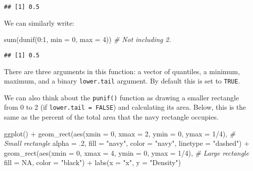 \documentclass[
]{article}
\newenvironment{Shaded}{\begin{snugshade}}{\end{snugshade}}
\newcommand{\AttributeTok}[1]{\textcolor[rgb]{0.77,0.63,0.00}{#1}}
\newcommand{\CommentTok}[1]{\textcolor[rgb]{0.56,0.35,0.01}{\textit{#1}}}
\newcommand{\ConstantTok}[1]{\textcolor[rgb]{0.00,0.00,0.00}{#1}}
\newcommand{\DecValTok}[1]{\textcolor[rgb]{0.00,0.00,0.81}{#1}}
\newcommand{\FunctionTok}[1]{\textcolor[rgb]{0.00,0.00,0.00}{#1}}
\newcommand{\NormalTok}[1]{#1}
\newcommand{\SpecialCharTok}[1]{\textcolor[rgb]{0.00,0.00,0.00}{#1}}
\newcommand{\StringTok}[1]{\textcolor[rgb]{0.31,0.60,0.02}{#1}}
\begin{document}
\begin{verbatim}
## [1] 0.5
\end{verbatim}

We can similarly write:

\begin{Shaded}
\begin{Highlighting}[]
\FunctionTok{sum}\NormalTok{(}\FunctionTok{dunif}\NormalTok{(}\DecValTok{0}\SpecialCharTok{:}\DecValTok{1}\NormalTok{, }\AttributeTok{min =} \DecValTok{0}\NormalTok{, }\AttributeTok{max =} \DecValTok{4}\NormalTok{)) }\CommentTok{\# Not including 2.}
\end{Highlighting}
\end{Shaded}

\begin{verbatim}
## [1] 0.5
\end{verbatim}

There are three arguments in this function: a vector of quantiles, a minimum, maximum, and a binary \texttt{lower.tail} argument. By default this is set to \texttt{TRUE}.

We can also think about the \texttt{punif()} function as drawing a smaller rectangle from 0 to 2 (if \texttt{lower.tail\ =\ FALSE}) and calculating its area. Below, this is the same as the percent of the total area that the navy rectangle occupies.

\begin{Shaded}
\begin{Highlighting}[]
\FunctionTok{ggplot}\NormalTok{() }\SpecialCharTok{+}
  \FunctionTok{geom\_rect}\NormalTok{(}\FunctionTok{aes}\NormalTok{(}\AttributeTok{xmin =} \DecValTok{0}\NormalTok{, }\AttributeTok{xmax =} \DecValTok{2}\NormalTok{, }\AttributeTok{ymin =} \DecValTok{0}\NormalTok{, }\AttributeTok{ymax =} \DecValTok{1}\SpecialCharTok{/}\DecValTok{4}\NormalTok{),  }\CommentTok{\# Small rectangle}
            \AttributeTok{alpha =}\NormalTok{ .}\DecValTok{2}\NormalTok{, }
            \AttributeTok{fill =} \StringTok{"navy"}\NormalTok{, }
            \AttributeTok{color =} \StringTok{"navy"}\NormalTok{, }
            \AttributeTok{linetype =} \StringTok{"dashed"}\NormalTok{) }\SpecialCharTok{+}
    \FunctionTok{geom\_rect}\NormalTok{(}\FunctionTok{aes}\NormalTok{(}\AttributeTok{xmin =} \DecValTok{0}\NormalTok{, }\AttributeTok{xmax =} \DecValTok{4}\NormalTok{, }\AttributeTok{ymin =} \DecValTok{0}\NormalTok{, }\AttributeTok{ymax =} \DecValTok{1}\SpecialCharTok{/}\DecValTok{4}\NormalTok{), }\CommentTok{\# Large rectangle}
              \AttributeTok{fill =} \ConstantTok{NA}\NormalTok{, }
              \AttributeTok{color =} \StringTok{"black"}\NormalTok{) }\SpecialCharTok{+}
  \FunctionTok{labs}\NormalTok{(}\AttributeTok{x =} \StringTok{"x"}\NormalTok{, }\AttributeTok{y =} \StringTok{"Density"}\NormalTok{)}
\end{Highlighting}
\end{Shaded}
\end{document}
